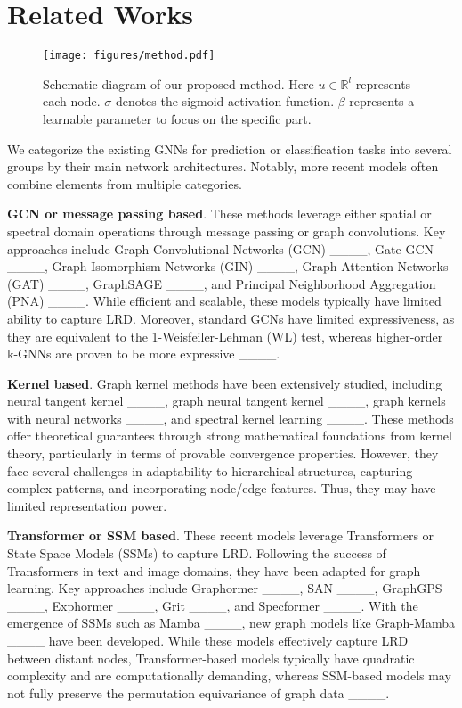 \section{Related Works}
\begin{figure*}[h]
    \centering
    \texttt{[image: figures/method.pdf]}
    \caption{Schematic diagram of our proposed method. Here $u\in\mathbb{R}^{l}$ represents each node. $\sigma$ denotes the sigmoid activation function. $\beta$ represents a learnable parameter to focus on the specific part.}
    \label{fig:method}
\end{figure*}
We categorize the existing GNNs for prediction or classification tasks into several groups by their main network architectures. Notably, more recent models often combine elements from multiple categories.

{\bf{GCN or message passing based}}. These methods leverage either spatial or spectral domain operations through message passing or graph convolutions. Key approaches include Graph Convolutional Networks (GCN) ____, Gate GCN ____, Graph Isomorphism Networks (GIN) ____, Graph Attention Networks (GAT) ____, GraphSAGE ____, and Principal Neighborhood Aggregation (PNA) ____. While efficient and scalable, these models typically have limited ability to capture LRD. Moreover, standard GCNs have limited expressiveness, as they are equivalent to the 1-Weisfeiler-Lehman (WL) test, whereas higher-order k-GNNs are proven to be more expressive ____.

{\bf{Kernel based}}. Graph kernel methods have been extensively studied, including neural tangent kernel ____, graph neural tangent kernel ____,
graph kernels with neural networks ____, and spectral kernel learning ____. These methods offer theoretical guarantees through strong mathematical foundations from kernel theory, particularly in terms of provable convergence properties.
However, they face several challenges in adaptability to hierarchical structures, capturing complex patterns, and incorporating node/edge features. Thus, they may have limited representation power. 

{\bf{Transformer or SSM based}}. These recent models leverage Transformers or State Space Models (SSMs) to capture LRD. Following the success of Transformers in text and image domains, they have been adapted for graph learning. Key approaches include Graphormer ____, SAN ____, GraphGPS ____, Exphormer ____, Grit ____, and Specformer ____. With the emergence of SSMs such as Mamba ____, new graph models like Graph-Mamba ____ have been developed. While these models effectively capture LRD between distant nodes, Transformer-based models typically have quadratic complexity and are computationally demanding, whereas SSM-based models may not fully preserve the permutation equivariance of graph data ____.

